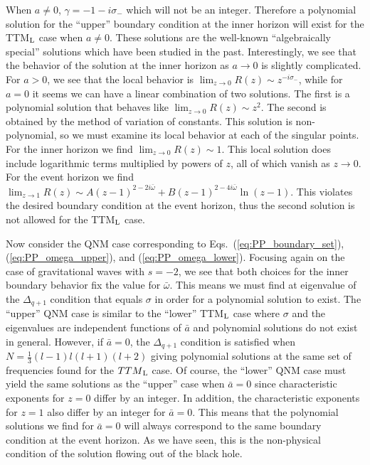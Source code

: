 \documentclass[11pt]{article}
\begin{document}
When $a\ne0$, $\gamma=-1-i\sigma_\minus$ which will not be an integer.
Therefore a polynomial solution for the ``upper'' boundary condition
at the inner horizon will exist for the TTM${}_{\rm{L}}$ case when
$a\ne0$.  These solutions are the well-known ``algebraically special''
solutions which have been studied in the past.  Interestingly, we see
that the behavior of the solution at the inner horizon as $a\to0$ is
slightly complicated.  For $a>0$, we see that the local behavior is
$\lim_{z\to0}R(z)\sim z^{-i\sigma_\minus}$, while for $a=0$ it seems
we can have a linear combination of two solutions.  The first is a
polynomial solution that behaves like $\lim_{z\to0}R(z)\sim z^2$.  The
second is obtained by the method of variation of constants.  This
solution is non-polynomial, so we must examine its local behavior at
each of the singular points.  For the inner horizon we find
$\lim_{z\to0}R(z)\sim 1$. This local solution does include logarithmic
terms multiplied by powers of $z$, all of which vanish as $z\to0$.
For the event horizon we find $\lim_{z\to1}R(z)\sim
A(z-1)^{2-2i\bar\omega}+B(z-1)^{2-4i\bar\omega}\ln(z-1)$.  This violates
the desired boundary condition at the event horizon, thus the second
solution is not allowed for the TTM${}_{\rm L}$ case.

Now consider the QNM case corresponding to
Eqs.~(\ref{eq:PP_boundary_set}), (\ref{eq:PP_omega_upper}), and
(\ref{eq:PP_omega_lower}).  Focusing again on the case of
gravitational waves with $s=-2$, we see that both choices for the
inner boundary behavior fix the value for $\bar\omega$.  This means we
must find at eigenvalue of the $\Delta_{q+1}$ condition that equals
$\sigma$ in order for a polynomial solution to exist.  The ``upper''
QNM case is similar to the ``lower'' TTM${}_{\rm L}$ case where
$\sigma$ and the eigenvalues are independent functions of $\bar{a}$
and polynomial solutions do not exist in general.  However, if
$\bar{a}=0$, the $\Delta_{q+1}$ condition is satisfied when
$N=\frac13(l-1)l(l+1)(l+2)$ giving polynomial solutions at the same
set of frequencies found for the $TTM{}_{\rm L}$ case.  Of course, the
``lower'' QNM case must yield the same solutions as the ``upper'' case
when $\bar{a}=0$ since characteristic exponents for $z=0$ differ by an
integer.  In addition, the characteristic exponents for $z=1$ also
differ by an integer for $\bar{a}=0$.  This means that the polynomial
solutions we find for $\bar{a}=0$ will always correspond to the same
boundary condition at the event horizon.  As we have seen, this is the
non-physical condition of the solution flowing out of the black hole.
\end{document}
